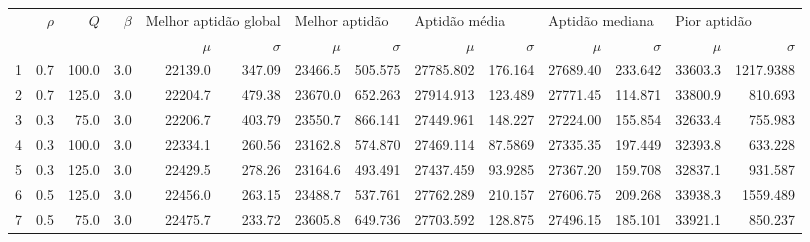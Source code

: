 \begin{tabular}{lrrrrrrrrrrrrr}
\toprule
   & $\rho$ & $Q$   & $\beta$ & \multicolumn{2}{p{2.0cm}}{Melhor aptidão global} & \multicolumn{2}{l}{Melhor aptidão} & \multicolumn{2}{l}{Aptidão média} & \multicolumn{2}{l}{Aptidão mediana} & \multicolumn{2}{l}{Pior aptidão}                                         \\
   &        &       &         & $\mu$                                            & $\sigma$                           & $\mu$                             & $\sigma$                            & $\mu$       & $\sigma$   & $\mu$    & $\sigma$   & $\mu$   & $\sigma$    \\
\midrule
1  & 0.7    & 100.0 & 3.0     & 22139.0                                          & 347.09                         & 23466.5                           & 505.575                          & 27785.802 & 176.164 & 27689.40 & 233.642 & 33603.3 & 1217.9388 \\
2  & 0.7    & 125.0 & 3.0     & 22204.7                                          & 479.38                         & 23670.0                           & 652.263                          & 27914.913 & 123.489 & 27771.45 & 114.871 & 33800.9 & 810.693 \\
3  & 0.3    & 75.0  & 3.0     & 22206.7                                          & 403.79                         & 23550.7                           & 866.141                          & 27449.961 & 148.227 & 27224.00 & 155.854 & 32633.4 & 755.983 \\
4  & 0.3    & 100.0 & 3.0     & 22334.1                                          & 260.56                         & 23162.8                           & 574.870                          & 27469.114 & 87.5869 & 27335.35 & 197.449 & 32393.8 & 633.228 \\
5  & 0.3    & 125.0 & 3.0     & 22429.5                                          & 278.26                         & 23164.6                           & 493.491                          & 27437.459 & 93.9285 & 27367.20 & 159.708 & 32837.1 & 931.587 \\
6  & 0.5    & 125.0 & 3.0     & 22456.0                                          & 263.15                         & 23488.7                           & 537.761                          & 27762.289 & 210.157 & 27606.75 & 209.268 & 33938.3 & 1559.489 \\
7  & 0.5    & 75.0  & 3.0     & 22475.7                                          & 233.72                         & 23605.8                           & 649.736                          & 27703.592 & 128.875 & 27496.15 & 185.101 & 33921.1 & 850.237 \\

\end{tabular}
